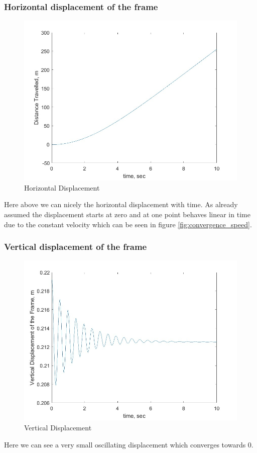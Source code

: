 \subsubsection{Horizontal displacement of the frame}
\begin{figure}[ht]
    \centering
    \includegraphics[scale=0.4]{images/horizontal_displacement.jpg}
    \caption{Horizontal Displacement}
    \label{fig:horizontal_displacement}
\end{figure}

Here above we can nicely the horizontal displacement with time. As already assumed the displacement starts at zero and at one point behaves linear in time due to the constant velocity which can be seen in figure \ref{fig:convergence_speed}.
\clearpage %

\subsubsection{Vertical displacement of the frame}
\begin{figure}[ht]
    \centering
    \includegraphics[scale=0.4]{images/vertical_displacement.jpg}
    \caption{Vertical Displacement}
    \label{fig:vertical_displacement}
\end{figure}
Here we can see a very small oscillating displacement which converges towards 0.
\clearpage %

